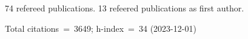74 refereed publications. 13 refeered publications as first author.

Total citations~=~3649; h-index~=~34 (2023-12-01)